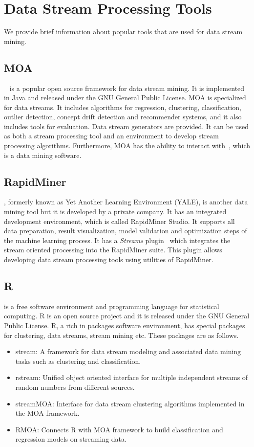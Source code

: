 \documentclass[smallcondensed]{svjour3}     %
\begin{document}
%
\section{Data Stream Processing Tools}
\label{sec:streamTools}
We provide brief information about popular tools that are used for data stream mining.

\subsection{MOA}
\label{subsec:moa}
\citeauthor{Moa}~\citep{Bifet:MOA} is a popular open source framework for data stream mining. It is implemented in Java and released under the GNU General Public License. MOA is specialized for data streams. It includes algorithms for regression, clustering, classification, outlier detection, concept drift detection and recommender systems, and it also includes tools for evaluation. Data stream generators are provided. It can be used as both a stream processing tool and an environment to develop stream processing algorithms. Furthermore, MOA has the ability to interact with~\citet{Weka}, which is a data mining software.

\subsection{RapidMiner}
\citet{RapidMiner}, formerly known as Yet Another Learning Environment (YALE), is another data mining tool but it is developed by a private company. It has an integrated development environment, which is called RapidMiner Studio. It supports all data preparation, result visualization, model validation and optimization steps of the machine learning process. It has a \textit{Streams} plugin~\citep{RapidMiner:Streams} which integrates the stream oriented processing into the RapidMiner suite. This plugin allows developing data stream processing tools using utilities of RapidMiner.

\subsection{R}
\citet{RProject} is a free software environment and programming language for statistical computing. R is an open source project and it is released under the GNU General Public License. R, a rich in packages software environment, has special packages for clustering, data streams, stream mining etc. These packages are as follows.
\begin{itemize}
	\item stream: A framework for data stream modeling and associated data mining tasks such as clustering and classification.
	\item rstream: Unified object oriented interface for multiple independent streams of random numbers from different sources.
	\item streamMOA: Interface for data stream clustering algorithms implemented in the MOA framework.
	\item RMOA: Connects R with MOA framework to build classification and regression models on streaming data.	
\end{itemize}
\end{document}
